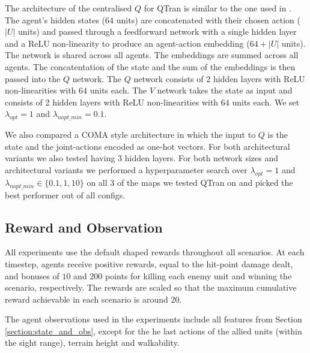 The architecture of the centralised $Q$ for QTran is similar to the one used in \citep{son_qtran2019}.
The agent's hidden states ($64$ units) are concatenated with their chosen action ($|U|$ units) and passed through a feedforward network with a single hidden layer and a ReLU non-linearity to produce an agent-action embedding ($64 + |U|$ units). The network is shared across all agents. The embeddings are summed across all agents.
The concatentation of the state and the sum of the embeddings is then passed into the $Q$ network.
The $Q$ network consists of 2 hidden layers with ReLU non-linearities with $64$ units each.
The $V$ network takes the state as input and consists of 2 hidden layers with ReLU non-linearities with $64$ units each.
We set $\lambda_{opt}=1$ and $\lambda_{nopt\_min}=0.1$.

We also compared a COMA style architecture in which the input to $Q$ is the state and the joint-actions encoded as one-hot vectors.
For both architectural variants we also tested having 3 hidden layers.
For both network sizes and architectural variants we performed a hyperparameter search over $\lambda_{opt}=1$ and $\lambda_{nopt\_min} \in \{0.1,1,10\}$ on all 3 of the maps we tested QTran on and picked the best performer out of all configs.

\subsection{Reward and Observation}

All experiments use the default shaped rewards throughout all scenarios. At each timestep, agents receive positive rewards, equal to the hit-point damage dealt, and bonuses of $10$ and $200$ points for killing each enemy unit and winning the scenario, respectively. The rewards are scaled so that the maximum cumulative reward achievable in each scenario is around $20$. 

The agent observations used in the experiments include all features from Section \ref{section:state_and_obs}, except for the he last actions of the allied units (within the sight range), terrain height and walkability.
